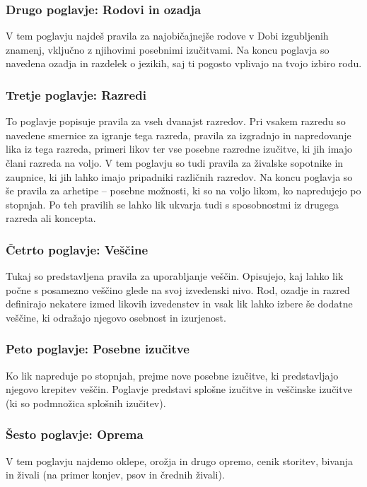 \subsubsection{Drugo poglavje: Rodovi in ozadja}
V tem poglavju najdeš pravila za najobičajnejše rodove v Dobi izgubljenih znamenj, vključno z njihovimi posebnimi izučitvami. Na koncu poglavja so navedena ozadja in razdelek o jezikih, saj ti pogosto vplivajo na tvojo izbiro rodu.

\subsubsection{Tretje poglavje: Razredi}
To poglavje popisuje pravila za vseh dvanajst razredov. Pri vsakem razredu so navedene smernice za igranje tega razreda, pravila za izgradnjo in napredovanje lika iz tega razreda, primeri likov ter vse posebne razredne izučitve, ki jih imajo člani razreda na voljo. V tem poglavju so tudi pravila za živalske sopotnike in zaupnice, ki jih lahko imajo pripadniki različnih razredov. Na koncu poglavja so še pravila za arhetipe -- posebne možnosti, ki so na voljo likom, ko napredujejo po stopnjah. Po teh pravilih se lahko lik ukvarja tudi s sposobnostmi iz drugega razreda ali koncepta.

\subsubsection{Četrto poglavje: Veščine}
Tukaj so predstavljena pravila za uporabljanje veščin. Opisujejo, kaj lahko lik počne s posamezno veščino glede na svoj izvedenski nivo. Rod, ozadje in razred definirajo nekatere izmed likovih izvedenstev in vsak lik lahko izbere še dodatne veščine, ki odražajo njegovo osebnost in izurjenost.

\subsubsection{Peto poglavje: Posebne izučitve}
Ko lik napreduje po stopnjah, prejme nove posebne izučitve, ki predstavljajo njegovo krepitev veščin. Poglavje predstavi splošne izučitve in veščinske izučitve (ki so podmnožica splošnih izučitev).

\subsubsection{Šesto poglavje: Oprema}
V tem poglavju najdemo oklepe, orožja in drugo opremo, cenik storitev, bivanja in živali (na primer konjev, psov in črednih živali).

